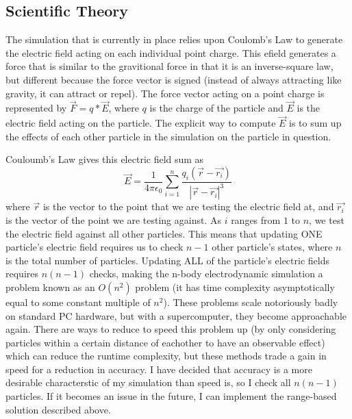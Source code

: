 \documentclass[10pt]{article}
\begin{document}
\subsection{Scientific Theory}
The simulation that is currently in place relies upon Coulomb's Law to generate the electric field acting on each individual point charge. This efield generates a force that is similar to the gravitional force in that it is an inverse-square law, but different because the force vector is signed (instead of always attracting like gravity, it can attract or repel). The force vector acting on a point charge is represented by $\vec{F} = q * \vec{E}$, where $q$ is the charge of the particle and $\vec{E}$ is the electric field acting on the particle. The explicit way to compute $\vec{E}$ is to sum up the effects of each other particle in the simulation on the particle in question.

Couloumb's Law gives this electric field sum as $$\vec{E} = \frac{1}{4\pi\epsilon_0}\sum_{i = 1}^n \frac{q_i (\vec{r} - \vec{r_i})}{|\vec{r} - \vec{r_i}|^3}$$ where $\vec{r}$ is the vector to the point that we are testing the electric field at, and $\vec{r_i}$ is the vector of the point we are testing against. As $i$ ranges from $1$ to $n$, we test the electric field against all other particles. This means that updating ONE particle's electric field requires us to check $n-1$ other particle's states, where $n$ is the total number of particles. Updating ALL of the particle's electric fields requires $n(n-1)$ checks, making the n-body electrodynamic simulation a problem known as an $O(n^2)$ problem (it has time complexity asymptotically equal to some constant multiple of $n^2$). These problems scale notoriously badly on standard PC hardware, but with a supercomputer, they become approachable again. There are ways to reduce to speed this problem up (by only considering particles within a certain distance of eachother to have an observable effect) which can reduce the runtime complexity, but these methods trade a gain in speed for a reduction in accuracy. I have decided that accuracy is a more desirable characterstic of my simulation than speed is, so I check all $n(n-1)$ particles. If it becomes an issue in the future, I can implement the range-based solution described above.
\end{document}
